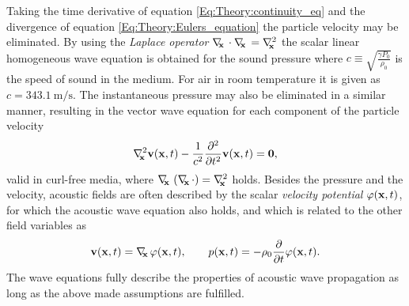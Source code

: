 %
%
Taking the time derivative of equation \eqref{Eq:Theory:continuity_eq} and the divergence of equation \eqref{Eq:Theory:Eulers_equation} the particle velocity may be eliminated. 
By using the \emph{Laplace operator} $\nabla_{\!\!\mathbf{x}}\, \cdot \nabla_{\!\!\mathbf{x}}\, = \nabla^2_{\!\!\mathbf{x}}$ the scalar linear homogeneous wave equation is obtained for the sound pressure
where $c \equiv \sqrt{ \frac{\gamma P_0}{\rho_0} }$ is the speed of sound in the medium. 
For air in room temperature it is given as $c = 343.1 ~ \mathrm{m}/\mathrm{s}$.
The instantaneous pressure may also be eliminated in a similar manner, resulting in the vector wave equation for each component of the particle velocity
\begin{equation}
\nabla^2_{\!\!\mathbf{x}} \mathbf{v}(\mathbf{x},t) - \frac{1}{c^2} \frac{\partial^2}{\partial t^2} \mathbf{v}(\mathbf{x},t) = \mathbf{0},
\label{Eq:Theory:Vector_wave_equation}
\end{equation}
valid in curl-free media, where $\nabla_{\!\!\mathbf{x}}\, \left( \nabla_{\!\!\mathbf{x}}\, \cdot \right) = \nabla^2_{\!\!\mathbf{x}}$ holds.
%
Besides the pressure and the velocity, acoustic fields are often described by the scalar \emph{velocity potential} $\varphi(\mathbf{x},t)$, for which the acoustic wave equation also holds, and which is related to the other field variables as 
\begin{equation}
\mathbf{v}(\mathbf{x},t) = \nabla_{\!\!\mathbf{x}}\, \varphi(\mathbf{x},t), \hspace{7mm} p(\mathbf{x},t) = -\rho_0 \frac{\partial}{\partial t} \varphi(\mathbf{x},t).
\label{eq:theory:velocity_potential_definition}
\end{equation}
%
The wave equations fully describe the properties of acoustic wave propagation as long as the above made assumptions are fulfilled.

